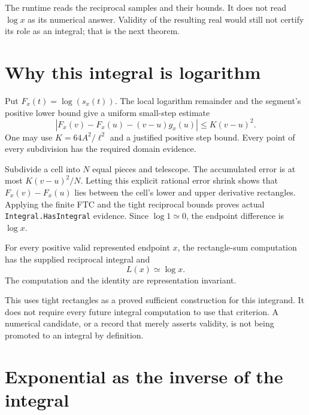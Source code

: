 The runtime reads the reciprocal samples and their bounds. It does not read
$\log x$ as its numerical answer. Validity of the resulting real would still
not certify its role as an integral; that is the next theorem.

\section{Why this integral is logarithm}\label{sec:integral-logarithm-proof}

Put $F_x(t)=\log(s_x(t))$. The local logarithm remainder and the segment's
positive lower bound give a uniform small-step estimate
\[
 |F_x(v)-F_x(u)-(v-u)g_x(u)|\leq K(v-u)^2.
\]
One may use $K=64A^2/\ell^2$ and a justified positive step bound. Every point
of every subdivision has the required domain evidence.

Subdivide a cell into $N$ equal pieces and telescope. The accumulated error
is at most $K(v-u)^2/N$. Letting this explicit rational error shrink shows
that $F_x(v)-F_x(u)$ lies between the cell's lower and upper derivative
rectangles. Applying the finite FTC and the tight reciprocal bounds proves
actual \texttt{Integral.HasIntegral} evidence. Since $\log 1\simeq0$, the
endpoint difference is $\log x$.

\begin{theorem}\label{thm:global-reciprocal-integral}
\leanok
For every positive valid represented endpoint $x$, the rectangle-sum
computation has the supplied reciprocal integral and
\[
 L(x)\simeq\log x.
\]
The computation and the identity are representation invariant.
\end{theorem}

This uses tight rectangles as a proved sufficient construction for this
integrand. It does not require every future integral computation to use that
criterion. A numerical candidate, or a record that merely asserts validity,
is not being promoted to an integral by definition.

\section{Exponential as the inverse of the integral}\label{sec:inverse-integral-exponential}

